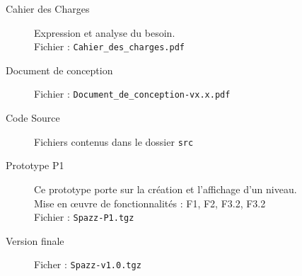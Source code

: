 \documentclass[a4paper,11pt]{scrartcl}
\begin{document}
\begin{description}
	\item [Cahier des Charges]	Expression et analyse du besoin.\\
								Fichier : \texttt{Cahier\_des\_charges.pdf}
	\item [Document de conception] Fichier : \texttt{Document\_de\_conception-vx.x.pdf}
    \item [Code Source]  Fichiers contenus dans le dossier \texttt{src}
	\item [Prototype P1] 	Ce prototype porte sur la création et l'affichage d'un niveau.\\
							Mise en œuvre de fonctionnalités : F1, F2, F3.2, F3.2\\
							Fichier : \texttt{Spazz-P1.tgz}
	\item [Version finale] Ficher : \texttt{Spazz-v1.0.tgz}
\end{description}
\end{document}
